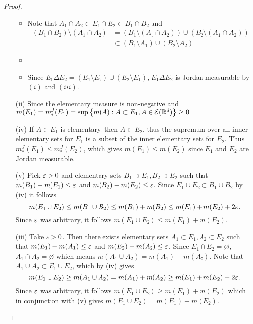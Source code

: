 \documentclass[hw_all.tex]{subfiles}
\begin{document}
\begin{proof}
\begin{enumerate}
\begin{itemize}
                \item Note that $A_1 \cap A_2 \subset E_1 \cap E_2 \subset B_1 \cap B_2$  and
                    \begin{align*}
                        (B_1 \cap B_2) \setminus (A_1 \cap A_2) &= (B_1 \setminus (A_1 \cap A_2)) \cup (B_2 \setminus (A_1 \cap A_2)) \\
                                                                &\subset (B_1 \setminus A_1) \cup (B_2 \setminus A_2)
                    \end{align*}
                \item 
                \item Since $E_1 \Delta E_2 = (E_1 \setminus E_2) \cup (E_2 \setminus E_1)$, $E_1 \Delta E_2$ is Jordan measurable by $(i)$ and $(iii)$.
            \end{itemize}
        \item[(ii)] Since the elementary measure is non-negative and $m(E_1) = m^J_*(E_1) = \sup\qty{m(A) : A \subset E_1, A \in \mathcal{E}(\mathbb{R}^d)} \geq 0$
        \item[(iv)] If $A \subset E_1$ is elementary, then $A \subset E_2$, thus the supremum over all inner elementary sets for $E_1$ is a subset of the inner elementary sets for $E_2$. Thus $m^J_*(E_1) \leq m^J_*(E_2)$, which gives $m(E_1) \leq m(E_2)$ since $E_1$ and $E_2$ are Jordan measurable.
        \item[(v)] Pick $\varepsilon > 0$ and elementary sets $B_1 \supset E_1, B_2 \supset E_2$ such that $m(B_1) - m(E_1) \leq \varepsilon$ and $m(B_2) - m(E_2) \leq \varepsilon$. Since $E_1 \cup E_2 \subset B_1 \cup B_2$ by (iv) it follows
            \[
                m(E_1 \cup E_2) \leq m(B_1 \cup B_2) \leq m(B_1) + m(B_2) \leq m(E_1) + m(E_2) + 2\varepsilon
            .\]
            Since $\varepsilon$ was arbitrary, it follows $m(E_1 \cup E_2) \leq m(E_1) + m(E_2)$.
        \item[(iii)] Take $\varepsilon > 0$. Then there exists elementary sets $A_1 \subset E_1, A_2 \subset E_2$ such that $m(E_1) - m(A_1) \leq \varepsilon$ and $m(E_2) - m(A_2) \leq \varepsilon$. Since $E_1 \cap E_2 = \varnothing$, $A_1 \cap A_2 = \varnothing$ which means $m(A_1 \cup A_2) = m(A_1) + m(A_2)$. Note that $A_1 \cup A_2 \subset E_1 \cup E_2$, which by (iv) gives
            \[
                m(E_1 \cup E_2) \geq m(A_1 \cup A_2) = m(A_1) + m(A_2) \geq m(E_1) + m(E_2) - 2\varepsilon
            .\]
            Since $\varepsilon$ was arbitrary, it follows $m(E_1 \cup E_2) \geq m(E_1) + m(E_2)$ which in conjunction with (v) gives $m(E_1 \cup E_2) = m(E_1) + m(E_2)$.

\end{enumerate}
\end{proof}
\end{document}
